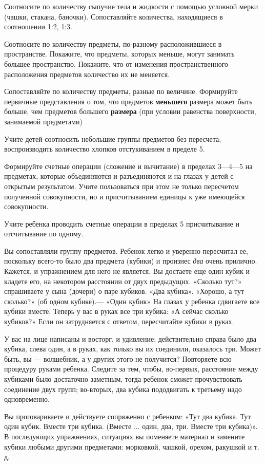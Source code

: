 \documentclass[a5paper]{book}
\renewcommand{\emph}[1]{\textit{#1}}
\begin{document}
Соотносите по количеству сыпучие тела и жидкости с помощью условной
мерки (чашки, стакана, баночки). Сопоставляйте количества, находящиеся в
соотношении 1:2, 1:3.

Соотносите по количеству предметы, по-разному расположившиеся в
пространстве. Покажите, что предметы, которых меньше, могут занимать
большее пространство. Покажите, что от изменения пространственного
расположения предметов количество их не меняется.

Сопоставляйте по количеству предметы, разные по величине. Формируйте
первичные представления о том, что предметов \textbf{меньшего} размера
может быть больше, чем предметов большего \textbf{размера} (при условии
равенства поверхности, занимаемой предметами)

Учите детей соотносить небольшие группы предметов без пересчета;
воспроизводить количество хлопков отстукиванием в пределе 5.

Формируйте счетные операции (сложение и вычитание) в пределах 3---4---5
на предметах, которые объединяются и разъединяются и на глазах у детей с
открытым результатом. Учите пользоваться при этом не только пересчетом
полученной совокупности, но и присчитыванием единицы к уже имеющейся
совокупности.

Учите ребенка проводить счетные операции в пределах 5 присчитывание и
отсчитывание по одному.

Вы сопоставляли группу предметов. Ребенок легко и уверенно пересчитал
ее, поскольку всего-то было два предмета (кубики) и произнес \emph{два}
очень прилично. Кажется, и упражнением для него не является. Вы достаете
еще один кубик и кладете его, на некотором расстоянии от двух
предыдущих. «Сколько тут?» спрашиваете у сына (дочери) о паре кубиков.
«Два кубика». «Хорошо, а тут сколько?» (об одном кубике).--- «Один
кубик» На глазах у ребенка сдвигаете все кубики вместе. Теперь у вас в
руках все три кубика: «А сейчас сколько кубиков?» Если он затрудняется с
ответом, пересчитайте кубики в руках.

У вас на лице написаны и восторг, и удивление; действительно справа было
два кубика, слева один, а в руках, как только вы их соединили, оказалось
три. Может быть, вы --- волшебник, а у других этого не получится?
Повторяете всю процедуру руками ребенка. Следите за тем, чтобы,
во-первых, расстояние между кубиками было достаточно заметным, тогда
ребенок сможет прочувствовать соединение двух групп; во-вторых, два
кубика пододвигать к третьему надо одновременно.

Вы проговариваете и действуете сопряженно с ребенком: «Тут два кубика.
Тут один кубик. Вместе три кубика. (Вместе ... один, два, три. Вместе
три кубика)». В последующих упражнениях, ситуациях вы поменяете материал
и замените кубики любыми другими предметами: морковкой, чашкой, орехом,
ракушкой и т. д.
\end{document}
